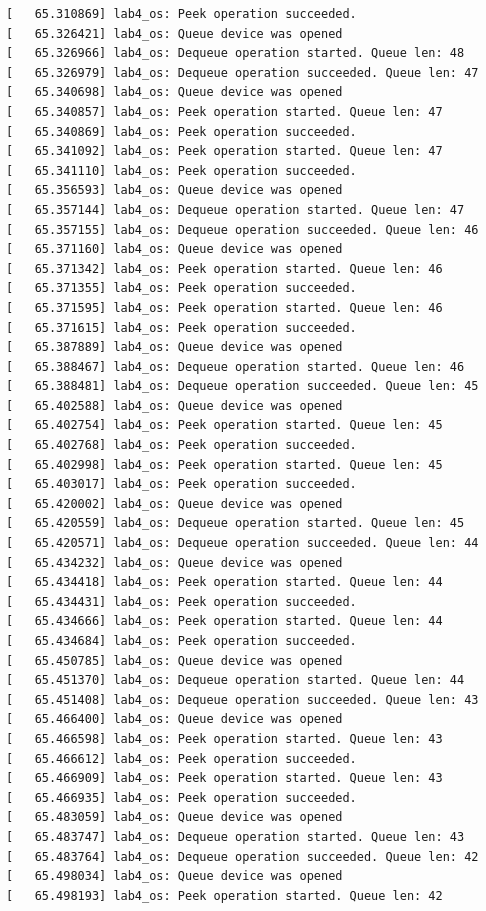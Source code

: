 \documentclass[a4paper,14pt]{extarticle}
\begin{document}
\begin{verbatim}
[   65.310869] lab4_os: Peek operation succeeded.
[   65.326421] lab4_os: Queue device was opened
[   65.326966] lab4_os: Dequeue operation started. Queue len: 48
[   65.326979] lab4_os: Dequeue operation succeeded. Queue len: 47
[   65.340698] lab4_os: Queue device was opened
[   65.340857] lab4_os: Peek operation started. Queue len: 47
[   65.340869] lab4_os: Peek operation succeeded.
[   65.341092] lab4_os: Peek operation started. Queue len: 47
[   65.341110] lab4_os: Peek operation succeeded.
[   65.356593] lab4_os: Queue device was opened
[   65.357144] lab4_os: Dequeue operation started. Queue len: 47
[   65.357155] lab4_os: Dequeue operation succeeded. Queue len: 46
[   65.371160] lab4_os: Queue device was opened
[   65.371342] lab4_os: Peek operation started. Queue len: 46
[   65.371355] lab4_os: Peek operation succeeded.
[   65.371595] lab4_os: Peek operation started. Queue len: 46
[   65.371615] lab4_os: Peek operation succeeded.
[   65.387889] lab4_os: Queue device was opened
[   65.388467] lab4_os: Dequeue operation started. Queue len: 46
[   65.388481] lab4_os: Dequeue operation succeeded. Queue len: 45
[   65.402588] lab4_os: Queue device was opened
[   65.402754] lab4_os: Peek operation started. Queue len: 45
[   65.402768] lab4_os: Peek operation succeeded.
[   65.402998] lab4_os: Peek operation started. Queue len: 45
[   65.403017] lab4_os: Peek operation succeeded.
[   65.420002] lab4_os: Queue device was opened
[   65.420559] lab4_os: Dequeue operation started. Queue len: 45
[   65.420571] lab4_os: Dequeue operation succeeded. Queue len: 44
[   65.434232] lab4_os: Queue device was opened
[   65.434418] lab4_os: Peek operation started. Queue len: 44
[   65.434431] lab4_os: Peek operation succeeded.
[   65.434666] lab4_os: Peek operation started. Queue len: 44
[   65.434684] lab4_os: Peek operation succeeded.
[   65.450785] lab4_os: Queue device was opened
[   65.451370] lab4_os: Dequeue operation started. Queue len: 44
[   65.451408] lab4_os: Dequeue operation succeeded. Queue len: 43
[   65.466400] lab4_os: Queue device was opened
[   65.466598] lab4_os: Peek operation started. Queue len: 43
[   65.466612] lab4_os: Peek operation succeeded.
[   65.466909] lab4_os: Peek operation started. Queue len: 43
[   65.466935] lab4_os: Peek operation succeeded.
[   65.483059] lab4_os: Queue device was opened
[   65.483747] lab4_os: Dequeue operation started. Queue len: 43
[   65.483764] lab4_os: Dequeue operation succeeded. Queue len: 42
[   65.498034] lab4_os: Queue device was opened
[   65.498193] lab4_os: Peek operation started. Queue len: 42

\end{verbatim}
\end{document}
